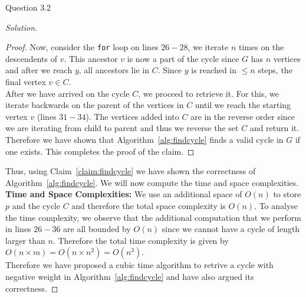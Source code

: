 \begin{solution}{Question 3.2}
\begin{proof}[Solution]
\begin{proof}
            Now, consider the \texttt{for} loop on lines $26-28$, we iterate $n$ times on the descendents of $v$. This ancestor $v$ is now a part of the cycle since $G$ has $n$ vertices and after we reach $y$, all ancestors lie in $C$. Since $y$ is reached in $\leq n$ steps, the final vertex $v\in C$.\\
            After we have arrived on the cycle $C$, we proceed to retrieve it. For this, we iterate backwards on the parent of the vertices in $C$ until we reach the starting vertex $v$ (lines $31-34$). The vertices added into $C$ are in the reverse order since we are iterating from child to parent and thus we reverse the set $C$ and return it.\\
            Therefore we have shown that Algorithm~\ref{alg:findcycle} finds a valid cycle in $G$ if one exists. This completes the proof of the claim.
        \end{proof}
        Thus, using Claim~\ref{claim:findcycle} we have shown the correctness of Algorithm~\ref{alg:findcycle}. We will now compute the time and space complexities.\\

        \textbf{Time and Space Complexities:} We use an additional space of $O(n)$ to store $p$ and the cycle $C$ and therefore the total space complexity is $O(n)$. To analyse the time complexity, we observe that the additional computation that we perform in lines $26-36$ are all bounded by $O(n)$ since we cannot have a cycle of length larger than $n$. Therefore the total time complexity is given by $O(n\times m)=O(n\times n^2)=O(n^3)$.\\

        Therefore we have proposed a cubic time algorithm to retrive a cycle with negative weight in Algorithm~\ref{alg:findcycle} and have also argued its correctness.
    \end{proof}
\end{solution}
